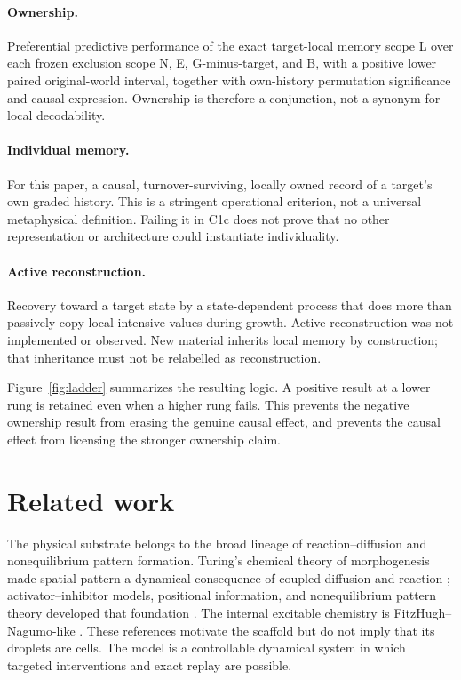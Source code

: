 \documentclass[11pt]{article}
\begin{document}
\paragraph{Ownership.}
Preferential predictive performance of the exact target-local memory scope L over each frozen exclusion scope N, E, G-minus-target, and B, with a positive lower paired original-world interval, together with own-history permutation significance and causal expression. Ownership is therefore a conjunction, not a synonym for local decodability.

\paragraph{Individual memory.}
For this paper, a causal, turnover-surviving, locally owned record of a target's own graded history. This is a stringent operational criterion, not a universal metaphysical definition. Failing it in C1c does not prove that no other representation or architecture could instantiate individuality.

\paragraph{Active reconstruction.}
Recovery toward a target state by a state-dependent process that does more than passively copy local intensive values during growth. Active reconstruction was not implemented or observed. New material inherits local memory by construction; that inheritance must not be relabelled as reconstruction.

Figure~\ref{fig:ladder} summarizes the resulting logic. A positive result at a lower rung is retained even when a higher rung fails. This prevents the negative ownership result from erasing the genuine causal effect, and prevents the causal effect from licensing the stronger ownership claim.

\section{Related work}

The physical substrate belongs to the broad lineage of reaction--diffusion and nonequilibrium pattern formation. Turing's chemical theory of morphogenesis made spatial pattern a dynamical consequence of coupled diffusion and reaction \citep{turing1952}; activator--inhibitor models, positional information, and nonequilibrium pattern theory developed that foundation \citep{gierer1972,wolpert1969,cross1993}. The internal excitable chemistry is FitzHugh--Nagumo-like \citep{fitzhugh1961,nagumo1962}. These references motivate the scaffold but do not imply that its droplets are cells. The model is a controllable dynamical system in which targeted interventions and exact replay are possible.
\end{document}

